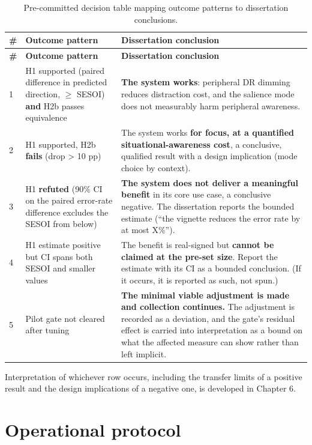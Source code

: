 \begin{longtable}{p{}|p{}|p{}}
\caption{Pre-committed decision table mapping outcome patterns to dissertation conclusions.}\\
\hline
\textbf{\#} & \textbf{Outcome pattern} & \textbf{Dissertation conclusion} \\
\hline
\endfirsthead
\hline
\textbf{\#} & \textbf{Outcome pattern} & \textbf{Dissertation conclusion} \\
\hline
\endhead
\hline
1 & H1 supported (paired difference in predicted direction, $\geq$ SESOI) \textbf{and} H2b passes equivalence & \textbf{The system works}: peripheral DR dimming reduces distraction cost, and the salience mode does not measurably harm peripheral awareness. \\
2 & H1 supported, H2b \textbf{fails} (drop > 10 pp) & The system works \textbf{for focus, at a quantified situational-awareness cost}, a conclusive, qualified result with a design implication (mode choice by context). \\
3 & H1 \textbf{refuted} (90\% CI on the paired error-rate difference excludes the SESOI from below) & \textbf{The system does not deliver a meaningful benefit} in its core use case, a conclusive negative. The dissertation reports the bounded estimate (``the vignette reduces the error rate by at most X\%''). \\
4 & H1 estimate positive but CI spans both SESOI and smaller values & The benefit is real-signed but \textbf{cannot be claimed at the pre-set size}. Report the estimate with its CI as a bounded conclusion. (If it occurs, it is reported as such, not spun.) \\
5 & Pilot gate not cleared after tuning & \textbf{The minimal viable adjustment is made and collection continues.} The adjustment is recorded as a deviation, and the gate's residual effect is carried into interpretation as a bound on what the affected measure can show rather than left implicit. \\
\hline
\end{longtable}

Interpretation of whichever row occurs, including the transfer limits of a positive result and the
design implications of a negative one, is developed in Chapter 6.

\section{Operational protocol}

